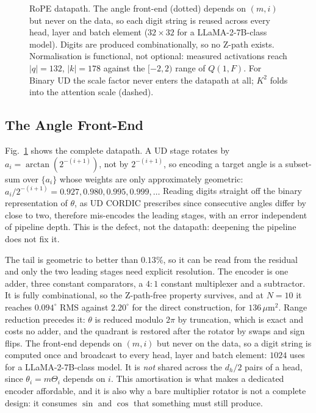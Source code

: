 \documentclass[conference]{IEEEtran}
\begin{document}
\begin{figure}[t]
\vspace{-4mm}
\caption{RoPE datapath. The angle front-end (dotted) depends on $(m,i)$ but
never on the data, so each digit string is reused across every head, layer and
batch element ($32\times32$ for a LLaMA-2-7B-class model). Digits are produced
combinationally, so no Z-path exists. Normalisation is functional, not
optional: measured activations reach $|q|=132$, $|k|=178$ against the $[-2,2)$
range of $Q(1,F)$. For Binary UD the scale factor never enters the datapath at
all; $K^{2}$ folds into the attention scale (dashed).}
\label{fig:arch}
\end{figure}

\subsection{The Angle Front-End}
\label{sec:encoder}

Fig.~\ref{fig:arch} shows the complete datapath. A UD stage rotates by
$a_i = \arctan(2^{-(i+1)})$, not by $2^{-(i+1)}$, so encoding a target angle is
a subset-sum over $\{a_i\}$ whose weights are only approximately geometric:
$a_i/2^{-(i+1)} = 0.927, 0.980, 0.995, 0.999,\ldots$ Reading digits straight
off the binary representation of $\theta$, as UD CORDIC prescribes since
consecutive angles differ by close to two, therefore mis-encodes the leading
stages, with an error independent of pipeline depth. This is the defect, not the datapath: deepening
the pipeline does not fix it.

The tail is geometric to better than $0.13\%$, so it can be read from the
residual and only the two leading stages need explicit resolution. The encoder
is one adder, three constant comparators, a $4{:}1$ constant multiplexer and a
subtractor. It is fully combinational, so the Z-path-free property survives,
and at $N=10$ it reaches $0.094^{\circ}$ RMS against $2.20^{\circ}$ for the direct
construction, for $136$\,$\mu$m$^2$. Range reduction precedes it: $\theta$ is
reduced modulo $2\pi$ by truncation, which is exact and costs no adder, and the
quadrant is restored after the rotator by swaps and sign flips. The front-end
depends on $(m,i)$ but never on the data, so a digit string is computed once
and broadcast to every head, layer and batch element: $1024$ uses for a
LLaMA-2-7B-class model. It is \emph{not} shared across the $d_h/2$ pairs of a
head, since $\theta_i = m\Theta_i$ depends on $i$. This amortisation is what
makes a dedicated encoder affordable, and it is also why a bare multiplier
rotator is not a complete design: it consumes $\sin$ and $\cos$ that something
must still produce.
\end{document}
